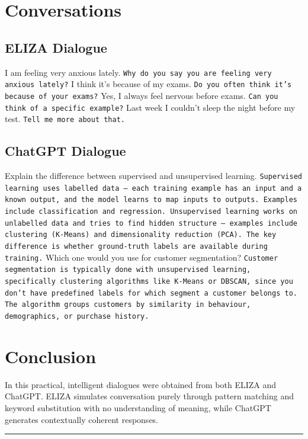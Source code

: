 \documentclass[12pt,a4paper]{report}
\newcommand{\divline}{
    \vspace{1em}
    \begin{center}
        \rule{0.8\textwidth}{0.6pt}
    \end{center}
    \vspace{1em}
}
\begin{document}
\section{Conversations}
\subsection{ELIZA Dialogue}

\begin{dialogue}
 I am feeling very anxious lately.
 \texttt{Why do you say you are feeling very anxious lately?}
 I think it's because of my exams.
 \texttt{Do you often think it's because of your exams?}
 Yes, I always feel nervous before exams.
 \texttt{Can you think of a specific example?}
 Last week I couldn't sleep the night before my test.
 \texttt{Tell me more about that.}
\end{dialogue}

\subsection{ChatGPT Dialogue}

\begin{dialogue}
 Explain the difference between supervised and unsupervised learning.
 \texttt{Supervised learning uses labelled data --- each training example has an input
and a known output, and the model learns to map inputs to outputs. Examples include
classification and regression. Unsupervised learning works on unlabelled data and tries
to find hidden structure --- examples include clustering (K-Means) and dimensionality
reduction (PCA). The key difference is whether ground-truth labels are available during training.}
 Which one would you use for customer segmentation?
 \texttt{Customer segmentation is typically done with unsupervised learning,
specifically clustering algorithms like K-Means or DBSCAN, since you don't have predefined
labels for which segment a customer belongs to. The algorithm groups customers by similarity
in behaviour, demographics, or purchase history.}
\end{dialogue}

\section{Conclusion}
In this practical, intelligent dialogues were obtained from both ELIZA and ChatGPT. ELIZA simulates conversation purely through pattern matching and keyword substitution
with no understanding of meaning, while ChatGPT generates contextually coherent responses.
\\
\divline
\end{document}
